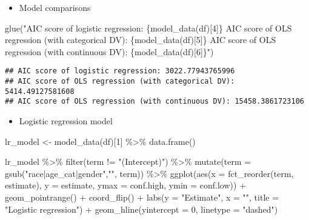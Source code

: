 \documentclass[
]{book}
\newenvironment{Shaded}{\begin{snugshade}}{\end{snugshade}}
\newcommand{\AttributeTok}[1]{\textcolor[rgb]{0.77,0.63,0.00}{#1}}
\newcommand{\DecValTok}[1]{\textcolor[rgb]{0.00,0.00,0.81}{#1}}
\newcommand{\FunctionTok}[1]{\textcolor[rgb]{0.00,0.00,0.00}{#1}}
\newcommand{\NormalTok}[1]{#1}
\newcommand{\OtherTok}[1]{\textcolor[rgb]{0.56,0.35,0.01}{#1}}
\newcommand{\SpecialCharTok}[1]{\textcolor[rgb]{0.00,0.00,0.00}{#1}}
\newcommand{\StringTok}[1]{\textcolor[rgb]{0.31,0.60,0.02}{#1}}
\providecommand{\tightlist}{%
  \setlength{\itemsep}{0pt}\setlength{\parskip}{0pt}}
\begin{document}
\begin{itemize}
\tightlist
\item
  Model comparisons
\end{itemize}

\begin{Shaded}
\begin{Highlighting}[]
\FunctionTok{glue}\NormalTok{(}\StringTok{"AIC score of logistic regression: \{model\_data(df)[4]\} }
\StringTok{      AIC score of OLS regression (with categorical DV):  \{model\_data(df)[5]\}}
\StringTok{      AIC score of OLS regression (with continuous DV): \{model\_data(df)[6]\}"}\NormalTok{)}
\end{Highlighting}
\end{Shaded}

\begin{verbatim}
## AIC score of logistic regression: 3022.77943765996 
## AIC score of OLS regression (with categorical DV):  5414.49127581608
## AIC score of OLS regression (with continuous DV): 15458.3861723106
\end{verbatim}

\begin{itemize}
\tightlist
\item
  Logistic regression model
\end{itemize}

\begin{Shaded}
\begin{Highlighting}[]
\NormalTok{lr\_model }\OtherTok{\textless{}{-}} \FunctionTok{model\_data}\NormalTok{(df)[}\DecValTok{1}\NormalTok{] }\SpecialCharTok{\%\textgreater{}\%} 
  \FunctionTok{data.frame}\NormalTok{()}

\NormalTok{lr\_model }\SpecialCharTok{\%\textgreater{}\%}
  \FunctionTok{filter}\NormalTok{(term }\SpecialCharTok{!=} \StringTok{"(Intercept)"}\NormalTok{) }\SpecialCharTok{\%\textgreater{}\%}
  \FunctionTok{mutate}\NormalTok{(}\AttributeTok{term =} \FunctionTok{gsub}\NormalTok{(}\StringTok{"race|age\_cat|gender"}\NormalTok{,}\StringTok{""}\NormalTok{, term)) }\SpecialCharTok{\%\textgreater{}\%}
  \FunctionTok{ggplot}\NormalTok{(}\FunctionTok{aes}\NormalTok{(}\AttributeTok{x =} \FunctionTok{fct\_reorder}\NormalTok{(term, estimate), }\AttributeTok{y =}\NormalTok{ estimate, }\AttributeTok{ymax =}\NormalTok{ conf.high, }\AttributeTok{ymin =}\NormalTok{ conf.low)) }\SpecialCharTok{+}
  \FunctionTok{geom\_pointrange}\NormalTok{() }\SpecialCharTok{+}
  \FunctionTok{coord\_flip}\NormalTok{() }\SpecialCharTok{+}
  \FunctionTok{labs}\NormalTok{(}\AttributeTok{y =} \StringTok{"Estimate"}\NormalTok{, }\AttributeTok{x =} \StringTok{""}\NormalTok{,}
      \AttributeTok{title =} \StringTok{"Logistic regression"}\NormalTok{) }\SpecialCharTok{+}
  \FunctionTok{geom\_hline}\NormalTok{(}\AttributeTok{yintercept =} \DecValTok{0}\NormalTok{, }\AttributeTok{linetype =} \StringTok{"dashed"}\NormalTok{)}
\end{Highlighting}
\end{Shaded}
\end{document}
